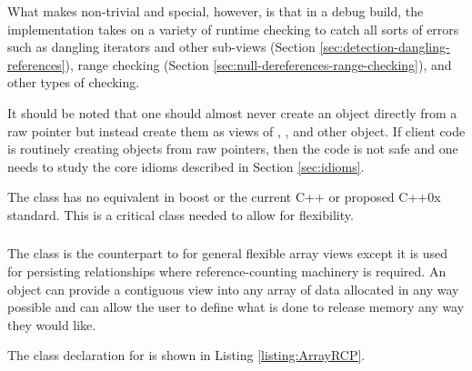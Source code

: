 \documentclass[pdf,ps2pdf,11pt]{SANDreport}
\begin{document}
What makes {} non-trivial and special, however, is
that in a debug build, the implementation takes on a variety of
runtime checking to catch all sorts of errors such as dangling
iterators and other sub-views (Section
{}\ref{sec:detection-dangling-references}), range checking (Section
{}\ref{sec:null-dereferences-range-checking}), and other types of
checking.

It should be noted that one should almost never create an
{} object directly from a raw pointer but instead
create them as views of {}, {}, {}
and other {} object.  If client code is routinely
creating {} objects from raw pointers, then the code is
not safe and one needs to study the core idioms described in Section
{}\ref{sec:idioms}.

The class {} has no equivalent in boost or the
current C++ or proposed C++0x standard.  This is a critical class
needed to allow for flexibility.


%
{}\subsubsection{}
\label{sec:ArrayRCP}
%

The class {} is the counterpart to
{} for general flexible array views except it is
used for persisting relationships where reference-counting machinery
is required.  An {} object can provide a contiguous
view into any array of data allocated in any way possible and can
allow the user to define what is done to release memory any way they
would like.

The class declaration for {} is shown in
Listing {}\ref{listing:ArrayRCP}.
\end{document}

